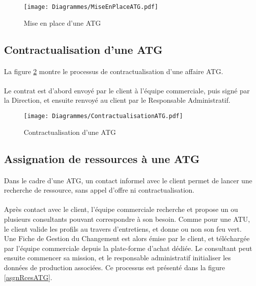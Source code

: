 \begin{figure}[H]
	\centering
	\texttt{[image: Diagrammes/MiseEnPlaceATG.pdf]}
	\caption{Mise en place d'une ATG} 
	\label{miseEnPlaceATG}
\end{figure}


\subsection{Contractualisation d'une ATG}
\label{subsection:contratATG}

\paragraph{} La figure \ref{contratATG} montre le processus de contractualisation d'une affaire ATG.
\paragraph{} Le contrat est d'abord envoyé par le client à l'équipe commerciale, puis signé par la Direction, et ensuite renvoyé au client par le Responsable Administratif. 


\begin{figure}[H]
	\centering
	\texttt{[image: Diagrammes/ContractualisationATG.pdf]}
	\caption{Contractualisation d'une ATG} 
	\label{contratATG}
\end{figure}



\subsection{Assignation de ressources à une ATG}

\paragraph{} Dans le cadre d'une ATG, un contact informel avec le client permet de lancer une recherche de ressource, sans appel d'offre ni contractualisation.
\paragraph{}Après contact avec le client, l'équipe commerciale recherche et propose un ou plusieurs consultants pouvant correspondre à son besoin. Comme pour une ATU, le client valide les profils au travers d'entretiens, et donne ou non son feu vert. Une Fiche de Gestion du Changement est alors émise par le client, et téléchargée par l'équipe commerciale depuis la plate-forme d'achat dédiée. Le consultant peut ensuite commencer sa mission, et le responsable administratif initialiser les données de production associées.
Ce processus est présenté dans la figure \ref{asgnRcesATG}.

